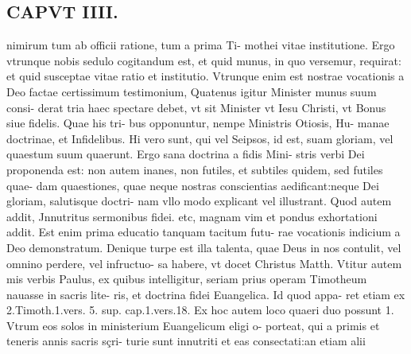 \documentclass{article}
\begin{document}
\begin{pages}
\section*{CAPVT  IIII. }
\marginpar{[ p.201 ]}\pstart nimirum tum ab officii ratione, tum a prima Ti- mothei vitae institutione. Ergo vtrunque nobis sedulo cogitandum est, et quid munus, in quo versemur, requirat: et quid susceptae vitae ratio et institutio. Vtrunque enim est nostrae vocationis a Deo factae certissimum testimonium, Quatenus igitur Minister munus suum consi- derat tria haec spectare debet, vt sit Minister vt Iesu Christi, vt Bonus siue fidelis. Quae his tri- bus opponuntur, nempe Ministris Otiosis, Hu- manae doctrinae, et Infidelibus. Hi vero sunt, qui vel Seipsos, id est, suam gloriam, vel quaestum suum quaerunt. Ergo sana doctrina a fidis Mini- stris verbi Dei proponenda est: non autem inanes, non futiles, et subtiles quidem, sed futiles quae- dam quaestiones, quae neque nostras conscientias aedificant:neque Dei gloriam, salutisque doctri- nam vllo modo explicant vel illustrant. Quod autem addit, Jnnutritus sermonibus fidei. etc, magnam vim et pondus exhortationi addit. Est enim prima educatio tanquam tacitum futu- rae vocationis indicium a Deo demonstratum. Denique turpe est illa talenta, quae Deus in nos contulit, vel omnino perdere, vel infructuo- sa habere, vt docet Christus Matth. Vtitur autem mis verbis Paulus, ex quibus intelligitur, seriam prius operam Timotheum nauasse in sacris lite- ris, et doctrina fidei Euangelica. Id quod appa- ret etiam ex 2.Timoth.1.vers. 5. sup. cap.1.vers.18. Ex hoc autem loco quaeri duo possunt 1. Vtrum eos solos in ministerium Euangelicum eligi o- porteat, qui a primis et teneris annis sacris sçri- turie sunt innutriti et eas consectati:an etiam alii  \pend

\end{pages}
\end{document}
